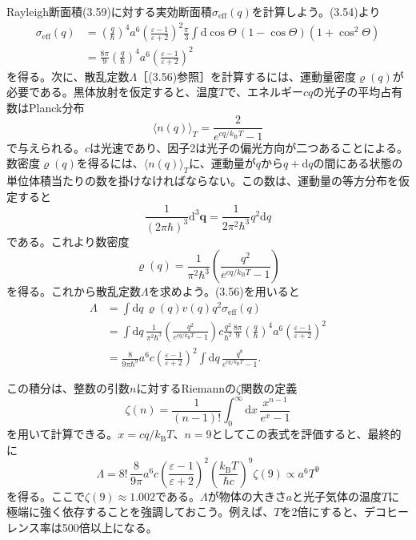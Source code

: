 Rayleigh断面積(3.59)に対する実効断面積$\sigma_{\mathrm{eff}}(q)$を計算しよう。(3.54)より
\begin{equation}
\begin{aligned}
\sigma_{\mathrm{eff}}(q)
&=\left(\frac q\hbar\right)^4a^6\left(\frac{\varepsilon-1}{\varepsilon+2}\right)^2\frac\pi3\int\mathrm d\cos\Theta\,(1-\cos\Theta)(1+\cos^2\Theta)\\
&=\frac{8\pi}{9}\left(\frac q\hbar\right)^4a^6\left(\frac{\varepsilon-1}{\varepsilon+2}\right)^2
\end{aligned}\tag{3.60}
\end{equation}
を得る。次に、散乱定数$\Lambda$［(3.56)参照］を計算するには、運動量密度$\varrho(q)$が必要である。黒体放射を仮定すると、温度$T$で、エネルギー$cq$の光子の平均占有数はPlanck分布
\begin{equation}
\langle n(q)\rangle_T=\frac{2}{e^{cq/k_{\mathrm B}T}-1}
\tag{3.61}
\end{equation}
で与えられる。$c$は光速であり、因子2は光子の偏光方向が二つあることによる。数密度$\varrho(q)$を得るには、$\langle n(q)\rangle_T$に、運動量が$q$から$q+\mathrm dq$の間にある状態の単位体積当たりの数を掛けなければならない。この数は、運動量の等方分布を仮定すると
\begin{equation}
\frac{1}{(2\pi\hbar)^3}\mathrm d^3\bm q=\frac{1}{2\pi^2\hbar^3}q^2\mathrm dq
\tag{3.62}
\end{equation}
である。これより数密度
\begin{equation}
\varrho(q)=\frac{1}{\pi^2\hbar^3}\left(\frac{q^2}{e^{cq/k_{\mathrm B}T}-1}\right)
\tag{3.63}
\end{equation}
を得る。これから散乱定数$\Lambda$を求めよう。(3.56)を用いると
\begin{equation}
\begin{aligned}
\Lambda&=\int\mathrm dq\,\varrho(q)v(q)q^2\sigma_{\mathrm{eff}}(q)\\
&=\int\mathrm dq\,\frac{1}{\pi^2\hbar^3}\left(\frac{q^2}{e^{cq/k_{\mathrm B}T}-1}\right)c\frac{q^2}{\hbar^2}\frac{8\pi}{9}\left(\frac q\hbar\right)^4a^6\left(\frac{\varepsilon-1}{\varepsilon+2}\right)^2\\
&=\frac{8}{9\pi\hbar^9}a^6c\left(\frac{\varepsilon-1}{\varepsilon+2}\right)^2\int\mathrm dq\,\frac{q^8}{e^{cq/k_{\mathrm B}T}-1}.
\end{aligned}\tag{3.64}
\end{equation}

\hypertarget{srcpage:134}{}\label{srcpage:134}
この積分は、整数の引数$n$に対するRiemannの$\zeta$関数の定義
\begin{equation}
\zeta(n)=\frac{1}{(n-1)!}\int_0^\infty\mathrm dx\,\frac{x^{n-1}}{e^x-1}
\tag{3.65}
\end{equation}
を用いて計算できる。$x=cq/k_{\mathrm B}T$、$n=9$としてこの表式を評価すると、最終的に
\begin{equation}
\Lambda=8!\,\frac{8}{9\pi}a^6c\left(\frac{\varepsilon-1}{\varepsilon+2}\right)^2
\left(\frac{k_{\mathrm B}T}{\hbar c}\right)^9\zeta(9)\propto a^6T^9
\tag{3.66}
\end{equation}
を得る。ここで$\zeta(9)\approx1.002$である。$\Lambda$が物体の大きさ$a$と光子気体の温度$T$に極端に強く依存することを強調しておこう。例えば、$T$を2倍にすると、デコヒーレンス率は500倍以上になる。

